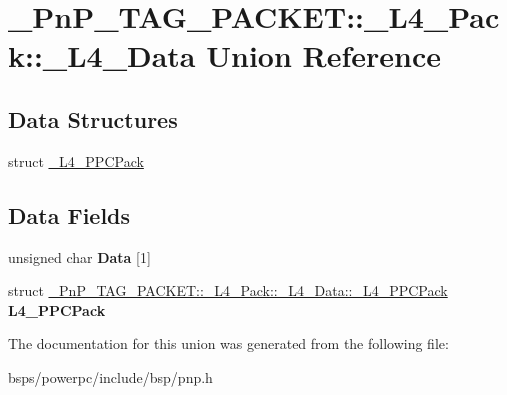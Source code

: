 \hypertarget{union__PnP__TAG__PACKET_1_1__L4__Pack_1_1__L4__Data}{}\section{\+\_\+\+Pn\+P\+\_\+\+T\+A\+G\+\_\+\+P\+A\+C\+K\+ET\+::\+\_\+\+L4\+\_\+\+Pack\+::\+\_\+\+L4\+\_\+\+Data Union Reference}
\label{union__PnP__TAG__PACKET_1_1__L4__Pack_1_1__L4__Data}
\subsection*{Data Structures}
\begin{DoxyCompactItemize}
\item 
struct \mbox{\hyperlink{struct__PnP__TAG__PACKET_1_1__L4__Pack_1_1__L4__Data_1_1__L4__PPCPack}{\+\_\+\+L4\+\_\+\+P\+P\+C\+Pack}}
\end{DoxyCompactItemize}
\subsection*{Data Fields}
\begin{DoxyCompactItemize}
\item 
\mbox{\label{union__PnP__TAG__PACKET_1_1__L4__Pack_1_1__L4__Data_a336a2e3b1072e034ca67f545f3055321}} 
unsigned char {\bfseries Data} \mbox{[}1\mbox{]}
\item 
\mbox{\label{union__PnP__TAG__PACKET_1_1__L4__Pack_1_1__L4__Data_a1b7c34f5a73281587e16d50b1ff00eb5}} 
struct \mbox{\hyperlink{struct__PnP__TAG__PACKET_1_1__L4__Pack_1_1__L4__Data_1_1__L4__PPCPack}{\+\_\+\+Pn\+P\+\_\+\+T\+A\+G\+\_\+\+P\+A\+C\+K\+E\+T\+::\+\_\+\+L4\+\_\+\+Pack\+::\+\_\+\+L4\+\_\+\+Data\+::\+\_\+\+L4\+\_\+\+P\+P\+C\+Pack}} {\bfseries L4\+\_\+\+P\+P\+C\+Pack}
\end{DoxyCompactItemize}


The documentation for this union was generated from the following file\+:\begin{DoxyCompactItemize}
\item 
bsps/powerpc/include/bsp/pnp.\+h\end{DoxyCompactItemize}
